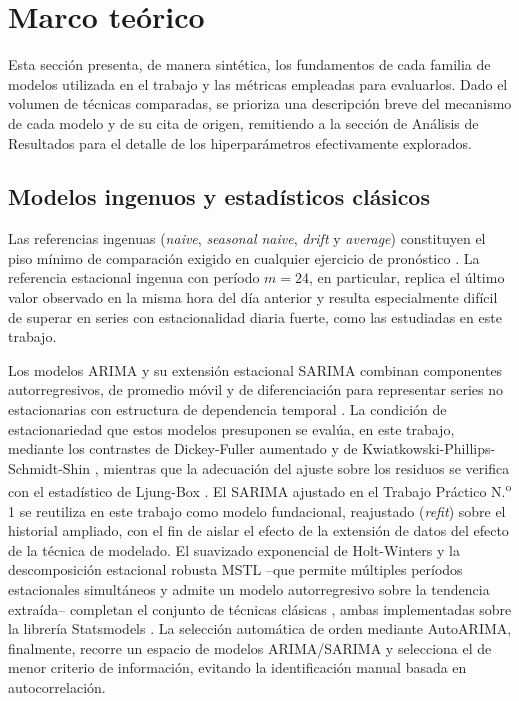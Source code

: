 \section{Marco teórico}

Esta sección presenta, de manera sintética, los fundamentos de cada familia de modelos utilizada en el
trabajo y las métricas empleadas para evaluarlos. Dado el volumen de técnicas comparadas, se prioriza una
descripción breve del mecanismo de cada modelo y de su cita de origen, remitiendo a la sección de Análisis
de Resultados para el detalle de los hiperparámetros efectivamente explorados.

\subsection{Modelos ingenuos y estadísticos clásicos}

Las referencias ingenuas (\emph{naive}, \emph{seasonal naive}, \emph{drift} y \emph{average}) constituyen
el piso mínimo de comparación exigido en cualquier ejercicio de pronóstico \parencite{hyndman2021}. La
referencia estacional ingenua con período $m=24$, en particular, replica el último valor observado en la
misma hora del día anterior y resulta especialmente difícil de superar en series con estacionalidad diaria
fuerte, como las estudiadas en este trabajo.

Los modelos ARIMA y su extensión estacional SARIMA combinan componentes autorregresivos, de promedio móvil
y de diferenciación para representar series no estacionarias con estructura de dependencia temporal
\parencite{box2015}. La condición de estacionariedad que estos modelos presuponen se evalúa, en este
trabajo, mediante los contrastes de Dickey-Fuller aumentado \parencite{dickey1979} y de
Kwiatkowski-Phillips-Schmidt-Shin \parencite{kwiatkowski1992}, mientras que la adecuación del ajuste sobre
los residuos se verifica con el estadístico de Ljung-Box \parencite{ljung1978}. El SARIMA ajustado en el
Trabajo Práctico N.\textsuperscript{o} 1 se reutiliza en este trabajo como modelo fundacional, reajustado
(\emph{refit}) sobre el historial ampliado, con el fin de aislar el efecto de la extensión de datos del
efecto de la técnica de modelado. El suavizado exponencial de Holt-Winters y la descomposición estacional
robusta MSTL --que permite múltiples períodos estacionales simultáneos y admite un modelo autorregresivo
sobre la tendencia extraída-- completan el conjunto de técnicas clásicas \parencite{hyndman2021}, ambas
implementadas sobre la librería Statsmodels \parencite{seabold2010}. La selección automática de orden
mediante AutoARIMA, finalmente, recorre un espacio de modelos ARIMA/SARIMA y selecciona el de menor
criterio de información, evitando la identificación manual basada en autocorrelación.

